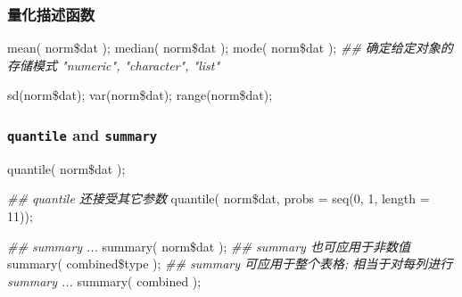 \documentclass[
]{article}
\newenvironment{Shaded}{}{}
\newcommand{\AttributeTok}[1]{\textcolor[rgb]{0.49,0.56,0.16}{#1}}
\newcommand{\DecValTok}[1]{\textcolor[rgb]{0.25,0.63,0.44}{#1}}
\newcommand{\DocumentationTok}[1]{\textcolor[rgb]{0.73,0.13,0.13}{\textit{#1}}}
\newcommand{\FunctionTok}[1]{\textcolor[rgb]{0.02,0.16,0.49}{#1}}
\newcommand{\NormalTok}[1]{#1}
\newcommand{\SpecialCharTok}[1]{\textcolor[rgb]{0.25,0.44,0.63}{#1}}
\begin{document}
\hypertarget{ux91cfux5316ux63cfux8ff0ux51fdux6570}{%
\subsubsection{量化描述函数}\label{ux91cfux5316ux63cfux8ff0ux51fdux6570}}

\begin{Shaded}
\begin{Highlighting}[]
\FunctionTok{mean}\NormalTok{( norm}\SpecialCharTok{\$}\NormalTok{dat );}
\FunctionTok{median}\NormalTok{( norm}\SpecialCharTok{\$}\NormalTok{dat );}
  \FunctionTok{mode}\NormalTok{( norm}\SpecialCharTok{\$}\NormalTok{dat ); }\DocumentationTok{\#\# 确定给定对象的存储模式 "numeric", "character", "list" }

\FunctionTok{sd}\NormalTok{(norm}\SpecialCharTok{\$}\NormalTok{dat);}
\FunctionTok{var}\NormalTok{(norm}\SpecialCharTok{\$}\NormalTok{dat);}
\FunctionTok{range}\NormalTok{(norm}\SpecialCharTok{\$}\NormalTok{dat);}
\end{Highlighting}
\end{Shaded}

\hypertarget{quantile-and-summary}{%
\subsubsection{\texorpdfstring{\texttt{quantile} and
\texttt{summary}}{quantile and summary}}\label{quantile-and-summary}}

\begin{Shaded}
\begin{Highlighting}[]
\FunctionTok{quantile}\NormalTok{( norm}\SpecialCharTok{\$}\NormalTok{dat );}

\DocumentationTok{\#\# quantile 还接受其它参数 }
\FunctionTok{quantile}\NormalTok{( norm}\SpecialCharTok{\$}\NormalTok{dat, }\AttributeTok{probs =} \FunctionTok{seq}\NormalTok{(}\DecValTok{0}\NormalTok{, }\DecValTok{1}\NormalTok{, }\AttributeTok{length =} \DecValTok{11}\NormalTok{));}

\DocumentationTok{\#\# summary ... }
\FunctionTok{summary}\NormalTok{( norm}\SpecialCharTok{\$}\NormalTok{dat );}
\DocumentationTok{\#\# summary 也可应用于非数值}
\FunctionTok{summary}\NormalTok{( combined}\SpecialCharTok{\$}\NormalTok{type );}
\DocumentationTok{\#\# summary 可应用于整个表格; 相当于对每列进行 summary ... }
\FunctionTok{summary}\NormalTok{( combined );}
\end{Highlighting}
\end{Shaded}
\end{document}
